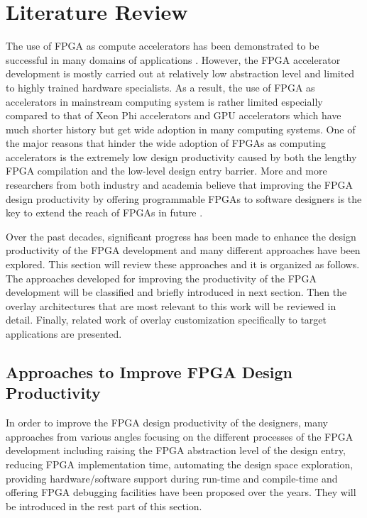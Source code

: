 \chapter{Literature Review} \label{chapter:litrev}
The use of FPGA as compute accelerators has been demonstrated to be successful in many domains of applications \cite{iouliia2004reconfigurable, souradip2010hardware, asano2009performance, che2008accelerating, thomas2009comparison}. However, the FPGA accelerator development is mostly carried out at relatively low abstraction level and limited to highly trained hardware specialists. As a result, the use of FPGA as accelerators in mainstream computing system is rather limited especially compared to that of Xeon Phi accelerators and GPU accelerators \cite{top500} which have much shorter history but get wide adoption in many computing systems. One of the major reasons that hinder the wide adoption of FPGAs as computing accelerators is the extremely low design productivity caused by both the lengthy FPGA compilation and the low-level design entry barrier. More and more researchers from both industry and academia believe that improving the FPGA design productivity by offering programmable FPGAs to software designers is the key to extend the reach of FPGAs in future \cite{cong2011high, raje2015fpl, fsp2015, fsp2014, olaf2013}. 

Over the past decades, significant progress has been made to enhance the design productivity of the FPGA development and many different approaches have been explored. This section will review these approaches and it is organized as follows. The approaches developed for improving the productivity of the FPGA development will be classified and briefly introduced in next section. Then the overlay architectures that are most relevant to this work will be reviewed in detail. Finally, related work of overlay customization specifically to target applications are presented.

\section{Approaches to Improve FPGA Design Productivity}
In order to improve the FPGA design productivity of the designers, many approaches from various angles focusing on the different processes of the FPGA development including raising the FPGA abstraction level of the design entry, reducing FPGA implementation time, automating the design space exploration, providing hardware/software support during run-time and compile-time and offering FPGA debugging facilities have been proposed over the years. They will be introduced in the rest part of this section. 

